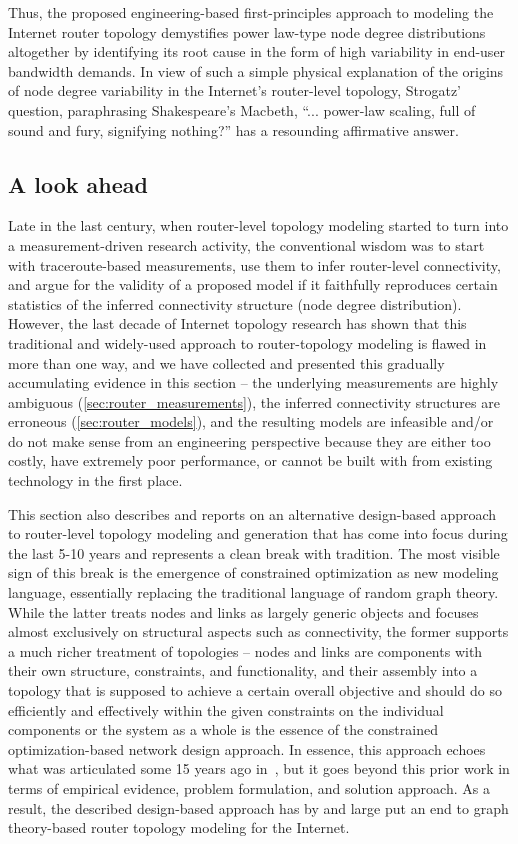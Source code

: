 Thus, the proposed engineering-based first-principles approach to
modeling the Internet router topology demystifies power law-type node
degree distributions altogether by identifying its root cause in the
form of high variability in end-user bandwidth demands. In view of
such a simple physical explanation of the origins of node degree
variability in the Internet's router-level topology, Strogatz'
question, paraphrasing Shakespeare's Macbeth, ``... power-law scaling,
full of sound and fury, signifying nothing?'' \cite{strogatz05:_roman}
has a resounding affirmative answer.


\subsection{A look ahead}

Late in the last century, when router-level topology modeling started
to turn into a measurement-driven research activity, the conventional
wisdom was to start with traceroute-based measurements, use them to
infer router-level connectivity, and argue for the validity of a
proposed model if it faithfully reproduces certain statistics of the
inferred connectivity structure (\eg node degree distribution).
However, the last decade of Internet topology research has shown that
this traditional and widely-used approach to router-topology modeling
is flawed in more than one way, and we have collected and presented
this gradually accumulating evidence in this section -- the underlying
measurements are highly ambiguous (\autoref{sec:router_measurements}),
the inferred connectivity structures are erroneous
(\autoref{sec:router_models}), and the resulting models are infeasible
and/or do not make sense from an engineering perspective because they
are either too costly, have extremely poor performance, or cannot be
built with from existing technology in the first place.

This section also describes and reports on an alternative design-based approach
to router-level topology modeling and generation that has come into focus during the
last 5-10 years and represents a clean break with tradition. The most visible sign 
of this break is the emergence of constrained optimization as new modeling language,
essentially replacing the traditional language of random graph theory.  While the 
latter treats nodes and links as largely generic objects and focuses almost exclusively 
on structural aspects such as connectivity, the former supports a much richer treatment 
of topologies -- nodes and links are components with their own structure, constraints, 
and functionality, and their assembly into a topology that is supposed to achieve a 
certain overall objective and should do so efficiently and effectively within the
given constraints on the individual components or the system as a whole is the essence 
of the constrained optimization-based network design approach.  In essence, this approach
echoes what was articulated some 15 years ago in~\cite{Doar96,Calvert97,Zegura97},
but it goes beyond this prior work in terms of empirical evidence, problem formulation,
and solution approach. As a result, the described design-based approach has by and large
put an end to graph theory-based router topology modeling for the Internet. 

